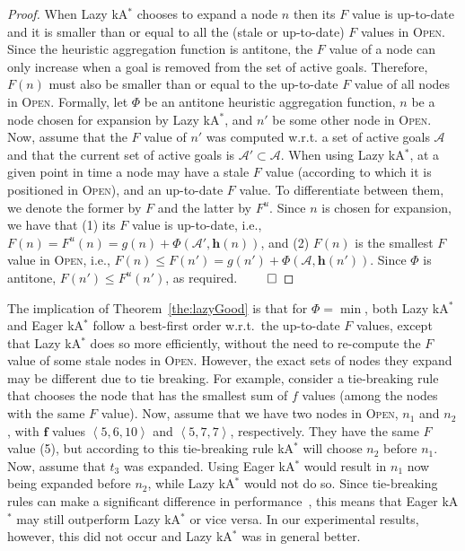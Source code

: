 \documentclass[smallextended]{svjour3}       %
\newcommand{\kastar}{kA$^*$\xspace}
\newcommand{\tuple}[1]{\ensuremath{\left \langle #1 \right \rangle }}
\newcommand{\open}{\textsc{Open}\xspace}
\newcommand{\activeg}{\mathcal{A}}
\newcommand{\vect}[1]{\mathbf{#1}}
\newcommand{\roni}[1]{\textbf{[RS:#1]}}
\begin{document}
\begin{proof}
When Lazy \kastar chooses to expand a node $n$ then its $F$ value is up-to-date and it is smaller than or equal to all the (stale or up-to-date) $F$ values in \open. Since the heuristic aggregation function is antitone, the $F$ value of a node can only increase when a goal is removed from the set of active goals. 
Therefore, $F(n)$ must also be smaller than or equal to the up-to-date $F$ value of all nodes in \open. 
Formally, let $\Phi$ be an antitone heuristic aggregation function, $n$ be a node chosen for expansion by Lazy \kastar, and $n'$ be some other node in \open. 
Now, assume that the $F$ value of $n'$ was computed w.r.t. a set of active goals $\activeg$ and that the current set of active goals is $\activeg'\subset \activeg$. When using Lazy \kastar, at a given point in time a node may have a stale $F$ value (according to which it is positioned in \open), and an up-to-date $F$ value. To differentiate between them, we denote the former by $F$ and the latter by $F^u$. Since $n$ is chosen for expansion, we have that (1) its $F$ value is up-to-date, i.e., $F(n)=F^u(n)=g(n)+\Phi(\activeg', \vect{h}(n))$, 
and (2) $F(n)$ is the smallest $F$ value in \open, i.e., $F(n)\leq F(n')=g(n')+\Phi(\activeg, \vect{h}(n'))$. Since $\Phi$ is antitone, $F(n')\leq F^u(n')$, as required.
$\qed$
\end{proof}


The implication of Theorem~\ref{the:lazyGood} is that for $\Phi=\min$, both Lazy \kastar and Eager \kastar follow a  best-first order w.r.t.~the up-to-date $F$ values, except that Lazy \kastar does so more efficiently, without the need to re-compute the $F$ value of some stale nodes in \open.
However, the exact sets of nodes they expand may be different due to tie breaking.
For example, consider a tie-breaking rule that chooses the node that has the smallest sum of $f$ values (among the nodes with the same $F$ value).
Now, assume that we have two nodes in \open, $n_1$ and $n_2$, with $\mathbf{f}$ values $\tuple{5, 6, 10 }$ and $\tuple{5, 7, 7}$, respectively.
They have the same $F$ value (5), but according to this tie-breaking rule \kastar will choose $n_2$ before $n_1$.
Now, assume that $t_3$ was expanded.
Using Eager \kastar would result in $n_1$ now being expanded before $n_2$, while Lazy \kastar would not do so.
Since tie-breaking rules can make a significant difference in performance~\cite{asai2017tieBreaking}, this means that Eager \kastar may still outperform Lazy \kastar or vice versa. 
In our experimental results, however, this did not occur and Lazy \kastar was in general better. %
\end{document}

